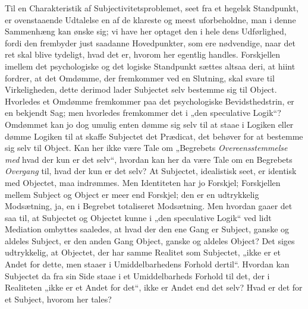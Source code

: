 \documentclass[11pt]{book}
\newcommand{\opage}[1]{\marginnote{\footnotesize\textit{[#1]}}}
\begin{document}
Til en Charakteristik af Subjectivitetsproblemet, seet fra et hegelsk
Standpunkt, er ovenstaaende Udtalelse en af de klareste og meest
uforbeholdne, man i denne Sammenhæng kan ønske sig; vi have her
optaget den i hele dens Udførlighed, fordi den frembyder just
saadanne Hovedpunkter, som ere nødvendige, naar det ret skal blive
tydeligt, hvad det er, hvorom her egentlig handles. Forskjellen
imellem det psychologiske og det logiske Standpunkt sættes altsaa
deri, at hiint fordrer, at det Omdømme, der fremkommer ved en
Slutning, skal svare til Virkeligheden, dette derimod lader Subjectet
selv bestemme sig til Object. Hvorledes et Omdømme fremkommer paa det
psychologiske Bevidsthedstrin, er en bekjendt Sag; men hvorledes
fremkommer det i „den speculative Logik“? Omdømmet kan jo dog umulig
enten dømme sig selv til at staae i Logiken eller dømme Logiken til at
skaffe Subjectet det Prædicat, det behøver for at bestemme sig selv
til Object. Kan her ikke være Tale om „Begrebets
\emph{Overeensstemmelse med}
\opage{40} \setcounter{footnote}{0}%
hvad der kun er det selv“, hvordan kan her da være Tale om en
Begrebets \emph{Overgang} til, hvad der kun er det selv? At Subjectet,
idealistisk seet, er identisk med Objectet, maa indrømmes. Men
Identiteten har jo Forskjel; Forskjellen mellem Subject og Object er
meer end Forskjel; den er en udtrykkelig Modsætning, ja, en i
Begrebet totaliseret Modsætning. Men hvordan gaaer det saa til, at
Subjectet og Objectet kunne i „den speculative Logik“ ved lidt
Mediation ombyttes saaledes, at hvad der den ene Gang er Subject,
ganske og aldeles Subject, er den anden Gang Object, ganske og
aldeles Object? Det siges udtrykkelig, at Objectet, der har samme
Realitet som Subjectet, „ikke er et Andet for dette, men staaer i
Umiddelbarhedens Forhold dertil“. Hvordan kan Subjectet da fra sin
Side staae i et Umiddelbarheds Forhold til det, der i Realiteten
„ikke er et Andet for det“, ikke er Andet end det selv? Hvad er det
for et Subject, hvorom her tales?
\end{document}
